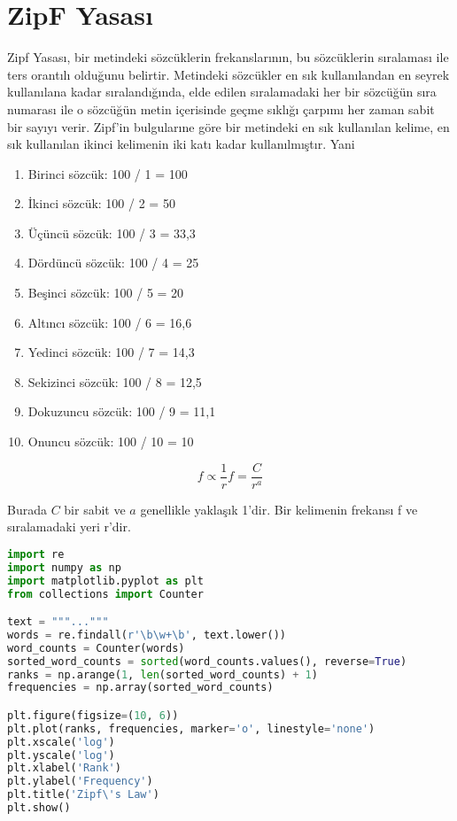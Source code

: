 \section{ZipF Yasası}
Zipf Yasası, bir metindeki sözcüklerin frekanslarının, bu sözcüklerin sıralaması ile ters orantılı olduğunu belirtir. Metindeki sözcükler en sık kullanılandan en seyrek kullanılana kadar sıralandığında, elde edilen sıralamadaki her bir sözcüğün sıra numarası ile o sözcüğün metin içerisinde geçme sıklığı çarpımı her zaman sabit bir sayıyı verir. Zipf'in bulgularıne göre bir metindeki en sık kullanılan kelime, en sık kullanılan ikinci kelimenin iki katı kadar kullanılmıştır.  Yani

\begin{enumerate}
	\item Birinci sözcük: 100 / 1 = 100
	\item İkinci sözcük: 100 / 2 = 50
	\item Üçüncü sözcük: 100 / 3 = 33,3
	\item Dördüncü sözcük: 100 / 4 = 25
	\item Beşinci sözcük: 100 / 5 = 20
	\item Altıncı sözcük: 100 / 6 = 16,6
	\item Yedinci sözcük: 100 / 7 = 14,3
	\item Sekizinci sözcük: 100 / 8 = 12,5
	\item Dokuzuncu sözcük: 100 / 9 = 11,1
	\item Onuncu sözcük: 100 / 10 = 10
\end{enumerate}

\[
f \propto \frac{1}{r}
f = \frac{C}{r^a}
\]

Burada \( C \) bir sabit ve \( a \) genellikle yaklaşık 1'dir. Bir kelimenin frekansı f ve sıralamadaki yeri r'dir.

\begin{lstlisting}[language=Python]
import re
import numpy as np
import matplotlib.pyplot as plt
from collections import Counter

text = """..."""
words = re.findall(r'\b\w+\b', text.lower())
word_counts = Counter(words)
sorted_word_counts = sorted(word_counts.values(), reverse=True)
ranks = np.arange(1, len(sorted_word_counts) + 1)
frequencies = np.array(sorted_word_counts)

plt.figure(figsize=(10, 6))
plt.plot(ranks, frequencies, marker='o', linestyle='none')
plt.xscale('log')
plt.yscale('log')
plt.xlabel('Rank')
plt.ylabel('Frequency')
plt.title('Zipf\'s Law')
plt.show()
\end{lstlisting}


\newpage